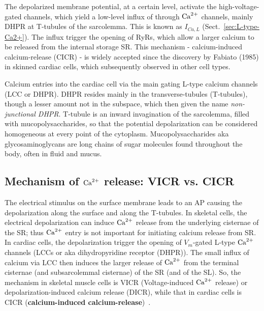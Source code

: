 The depolarized membrane potential, at a certain level, activate the
high-voltage-gated  channels, which yield a low-level influx of
 through ${\text{Ca}^{2+}}$ channels, mainly DHPR at T-tubules of the sarcolemma.
This is known as $I_{Ca,L}$ (Sect.~\ref{sec:L-type-Ca2+}). The  influx
trigger the opening of RyRs, which allow a larger calcium to be released from
the internal storage SR. This mechanism - calcium-induced calcium-release (CICR)
- is widely accepted since the discovery by Fabiato (1985) in skinned cardiac
cells, which subsequently observed in other cell types.

\begin{framed}  
  Calcium entries into the cardiac cell via the main gating L-type
  calcium channels (LCC or DHPR).  DHPR resides mainly in the
  transverse-tubules (T-tubules), though a lesser amount not in the
  subspace, which then given the name {\it non-junctional DHPR}.
  T-tubule is an inward invagination of the sarcolemma, filled with
  mucopolysaccharides, so that the potential depolarization can be considered
  homogeneous at every point of the cytoplasm. Mucopolysaccharides aka
  glycosaminoglycans are long chains of sugar molecules found throughout the
  body, often in fluid and mucus. 
\end{framed}

\subsection{Mechanism of ${\text{Ca}^{2+}}$ release: VICR vs. CICR}
\label{sec:VICR_CICR}

The electrical stimulus on the surface membrane leads to an AP causing the
depolarization along the surface and along the T-tubules.
In skeletal cells, the electrical depolarization can induce ${\text{Ca}^{2+}}$ release from
the underlying cisternae of the SR; thus ${\text{Ca}^{2+}}$ entry is not important for
initiating calcium release from SR. In cardiac cells, the depolarization trigger
the opening of $V_m$-gated L-type ${\text{Ca}^{2+}}$ channels (LCCs or aka dihydropyridine
receptor (DHPR)). The small influx of calcium via LCC then induces the larger
release of ${\text{Ca}^{2+}}$ from the terminal cisternae (and subsarcolemmal cisternae) of
the SR (and of the SL). So, the mechanism in skeletal muscle cells is VICR
(Voltage-induced ${\text{Ca}^{2+}}$ release) or depolarization-induced calcium release
(DICR), while that in cardiac cells is CICR ({\bf calcium-induced
calcium-release})~\citep{fabiato1975cic}.

